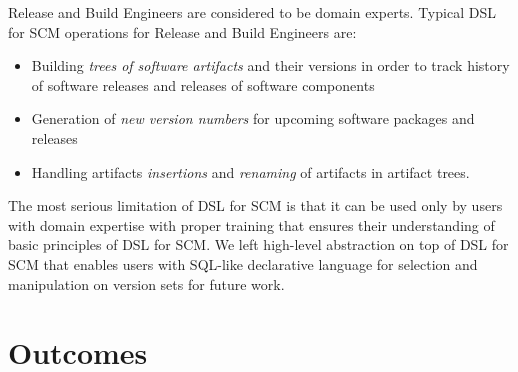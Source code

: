\documentclass[11pt]{article}
\begin{document}
Release and Build Engineers are considered to be domain experts. Typical DSL for SCM operations for Release and Build Engineers are:
\begin{itemize}
\item Building \textit{trees of software artifacts} and their versions in order to track history of software releases and releases of software components 
\item Generation of \textit{new version numbers} for upcoming software packages and releases
\item Handling artifacts \textit{insertions} and \textit{renaming} of artifacts in artifact trees.
\end{itemize}



The most serious limitation of DSL for SCM is that it can be used only by users with domain expertise with proper training that ensures their understanding of basic principles of DSL for SCM. We left high-level abstraction on top of DSL for SCM that enables users with SQL-like declarative language for selection and manipulation on version sets for future work.

\section{Outcomes}
\label{sec:outcomes}
\end{document}
